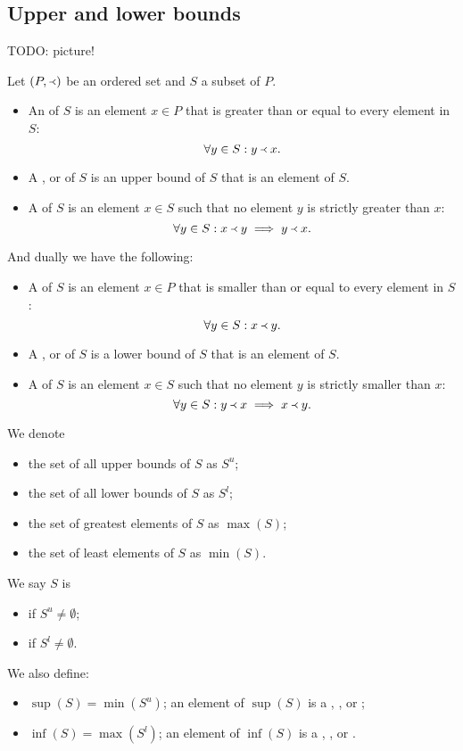\subsection{Upper and lower bounds}
TODO: picture!
\begin{definition}
Let $(P,\Yleft)$ be an ordered set and $S$ a subset of $P$.
\begin{itemize}
\item An  of $S$ is an element $x\in P$ that is greater than or equal to every element in $S$:
\[\forall y\in S: y\Yleft x. \]
\item A ,  or  of $S$ is an upper bound of $S$ that is an element of $S$.
\item A  of $S$ is an element $x\in S$ such that no element $y$ is strictly greater than $x$:
\[ \forall y\in S: x\Yleft y \implies y \Yleft x. \]
\end{itemize}
And dually we have the following:
\begin{itemize}
\item A  of $S$ is an element $x\in P$ that is smaller than or equal to every element in $S$:
\[ \forall y\in S: x\Yleft y. \]
\item A ,  or  of $S$ is a lower bound of $S$ that is an element of $S$.
\item A  of $S$ is an element $x\in S$ such that no element $y$ is strictly smaller than $x$:
\[ \forall y\in S: y\Yleft x \implies x \Yleft y. \]
\end{itemize}
We denote
\begin{itemize}
\item the set of all upper bounds of $S$ as $S^u$;
\item the set of all lower bounds of $S$ as $S^l$;
\item the set of greatest elements of $S$ as $\max(S)$;
\item the set of least elements of $S$ as $\min(S)$.
\end{itemize}
We say $S$ is
\begin{itemize}
\item {} if $S^u \neq \emptyset$;
\item {} if $S^l \neq \emptyset$.
\end{itemize}
We also define:
\begin{itemize}
\item $\sup(S) = \min(S^u)$; an element of $\sup(S)$ is a , , or ;
\item $\inf(S) = \max(S^l)$; an element of $\inf(S)$ is a , , or .
\end{itemize}
\end{definition}

